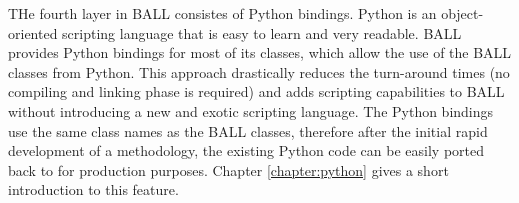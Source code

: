 THe fourth layer in BALL consistes of Python bindings. Python is an
object-oriented scripting language that is easy to learn and very readable.
BALL provides Python bindings for most of its classes, which allow the use of
the BALL \CPP classes from Python. This approach drastically reduces the
turn-around times (no compiling and linking phase is required) and adds
scripting capabilities to BALL without introducing a new and exotic scripting
language. The Python bindings use the same class names as the BALL classes,
therefore after the initial rapid development of a methodology, the existing
Python code can be easily ported back to \CPP for production purposes.
Chapter \ref{chapter:python} gives a short introduction to this feature.
